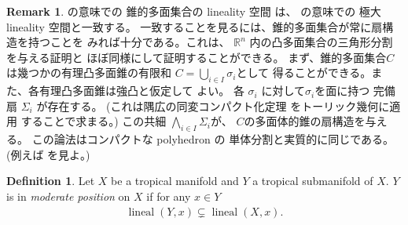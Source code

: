 \documentclass[a4paper,dvipdfmx,reqno,12pt]{amsart}
\theoremstyle{definition}
\newtheorem{definition}[theorem]{Definition}
\newtheorem{remark}[theorem]{Remark}
\newcommand{\opn}[1]{\operatorname{#1}}
\numberwithin{equation}{section}
\begin{document}
\begin{remark}
\cite[]{MR3041763}の意味での
錐的多面集合の lineality 空間
は、
\cite[]{MR4246795}の意味での
極大 lineality 空間と一致する。
一致することを見るには、錐的多面集合が常に扇構造を持つことを
みれば十分である。これは、
$\mathbb{R}^{n}$ 内の凸多面集合の三角形分割を与える証明と
ほぼ同様にして証明することができる。
まず、錐的多面集合$C$は幾つかの有理凸多面錐の有限和
$C=\bigcup_{i\in I}\sigma_i$として
得ることができる。また、各有理凸多面錐は強凸と仮定して
よい。
各 $\sigma_i$ に対して$\sigma_i$を面に持つ
完備扇 $\Sigma_i$ が存在する。
(これは隅広の同変コンパクト化定理
\cite[Theorem 3]{MR337963}をトーリック幾何に適用
することで求まる。)
この共細 $\bigwedge_{i\in I}\Sigma_i$が、
$C$の多面体的錐の扇構造を与える。
この論法はコンパクトな polyhedron の
単体分割と実質的に同じである。
(例えば\cite[Theorem 2.11]{MR665919}
を見よ。)
\end{remark}

\begin{definition}
\label{definition-permissible-position}
Let $X$ be a tropical manifold and $Y$ a
tropical submanifold of $X$.
$Y$ is in \emph{moderate position} on $X$ if
for any $x\in Y$
\begin{align}
     \opn{lineal}(Y,x) \subsetneq
 \opn{lineal}(X,x).
\end{align}
\end{definition}
\end{document}
